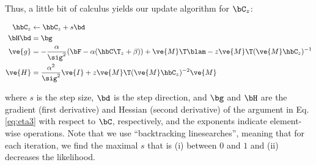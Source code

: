 %

Thus, a little bit of calculus yields our update algorithm for $\bC_z$:



\begin{subequations} \label{eq:NR}
\begin{align}
\hbC_{\zzz} &\leftarrow \hbC_{\zzz} + s \bd \\
\bH \bd &= \bg \\
\ve{g} &= -\frac{\alpha}{\sig^2}(\bF -\alpha({\hbC\T}_{\zzz} + \beta)) + \ve{M}\T\blam - \zzz \ve{M}\T (\ve{M} \hbC_{\zzz})^{-1} \label{eq:g} \\
\ve{H} &= \frac{\alpha^2}{\sig^2} \ve{I} + \zzz \ve{M}\T (\ve{M} \hbC_{\zzz})^{-2} \ve{M} \label{eq:H}
\end{align}
\end{subequations}

\noindent where $s$ is the step size, $\bd$ is the step direction, and $\bg$ and $\bH$ are the gradient (first derivative) and Hessian (second derivative) of the argument in Eq. \eqref{eq:eta3} with respect to $\bC$, respectively, and the exponents indicate element-wise operations. Note that we use ``backtracking linesearches'', meaning that for each iteration, we find the maximal $s$ that is (i) between $0$ and $1$ and (ii) decreases the likelihood.

